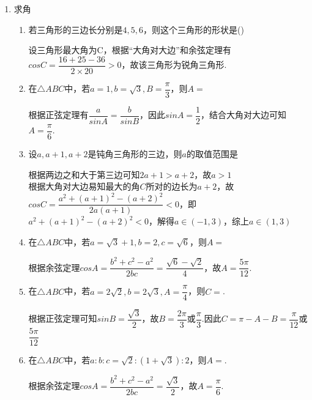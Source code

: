 \begin{enumerate}
\item 求角
    \begin{enumerate}
        \item 若三角形的三边长分别是$4,5,6$，则这个三角形的形状是\dotfill()
        \begin{jieda}
            设三角形最大角为C，根据“大角对大边”和余弦定理有$cosC = \dfrac{16+25-36}{2\times20} > 0$，故该三角形为锐角三角形.
        \end{jieda}
        \item 在$\triangle ABC$中，若$a = 1, b = \sqrt{3}, B = \dfrac{\pi}{3}$，则$A = $
        \begin{jieda}
            根据正弦定理有$\dfrac{a}{sinA} = \dfrac{b}{sinB}$，因此$sin A = \dfrac{1}{2}$，结合大角对大边可知$A = \dfrac{\pi}{6}$.
        \end{jieda}
        \item 设$a, a+1, a+2$是钝角三角形的三边，则$a$的取值范围是
        \begin{jieda}
            根据两边之和大于第三边可知$2a+1 > a+2$，故$a > 1$ \\
            根据大角对大边易知最大的角$C$所对的边长为$a+2$，故$cosC = \dfrac{a^2+(a+1)^2 - (a+2)^2}{2a(a+1)} < 0$，即$a^2+(a+1)^2 - (a+2)^2 < 0$，解得$a \in (-1, 3)$，综上$a \in (1, 3)$
        \end{jieda}
        \item 在$\triangle ABC$中，若$a = \sqrt{3}+1, b = 2, c = \sqrt{6}$，则$A = $
        \begin{jieda}
            根据余弦定理$cosA = \dfrac{b^2+c^2 -a^2}{2bc} = \dfrac{\sqrt{6} - \sqrt{2}}{4}$，故$A = \dfrac{5\pi}{12}$.
        \end{jieda}
        \item 在$\triangle ABC$中，若$a = 2\sqrt{2}, b = 2\sqrt{3}, A = \dfrac{\pi}{4}$，则$C = $.
        \begin{jieda}
            根据正弦定理可知$sinB = \dfrac{\sqrt{3}}{2}$，故$B = \dfrac{2\pi}{3}$或$\dfrac{\pi}{3}$.因此$C = \pi - A - B = \dfrac{\pi}{12}$或$\dfrac{5\pi}{12}$
        \end{jieda}
        \item 在$\triangle ABC$中，若$a : b : c = \sqrt{2} : (1+\sqrt{3}):2$，则$A = $.
        \begin{jieda}
            根据余弦定理$cosA = \dfrac{b^2+c^2 -a^2}{2bc} = \dfrac{\sqrt{3}}{2}$，故$A = \dfrac{\pi}{6}$.

\end{jieda}
\end{enumerate}
\end{enumerate}
